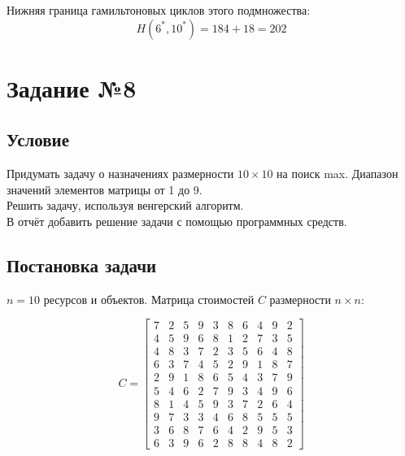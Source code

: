 \documentclass{article}
\begin{document}
Нижняя граница гамильтоновых циклов этого подмножества:
\[
    H(6^*,10^*) = 184 + 18 = 202
\]

\section{Задание №8}

\subsection{Условие}

Придумать задачу о назначениях размерности $10 \times 10$ на поиск max. Диапазон значений элементов матрицы от 1 до 9.\\
Решить задачу, используя венгерский алгоритм.\\
В отчёт добавить решение задачи с помощью программных средств.

\subsection{Постановка задачи}

$n = 10$ ресурсов и объектов. Матрица стоимостей $C$ размерности $n \times n$:

\[
    C = \begin{bmatrix}
        7 & 2 & 5 & 9 & 3 & 8 & 6 & 4 & 9 & 2 \\
        4 & 5 & 9 & 6 & 8 & 1 & 2 & 7 & 3 & 5 \\
        4 & 8 & 3 & 7 & 2 & 3 & 5 & 6 & 4 & 8 \\
        6 & 3 & 7 & 4 & 5 & 2 & 9 & 1 & 8 & 7 \\
        2 & 9 & 1 & 8 & 6 & 5 & 4 & 3 & 7 & 9 \\
        5 & 4 & 6 & 2 & 7 & 9 & 3 & 4 & 9 & 6 \\
        8 & 1 & 4 & 5 & 9 & 3 & 7 & 2 & 6 & 4 \\
        9 & 7 & 3 & 3 & 4 & 6 & 8 & 5 & 5 & 5 \\
        3 & 6 & 8 & 7 & 6 & 4 & 2 & 9 & 5 & 3 \\
        6 & 3 & 9 & 6 & 2 & 8 & 8 & 4 & 8 & 2
    \end{bmatrix}
\]
\end{document}
